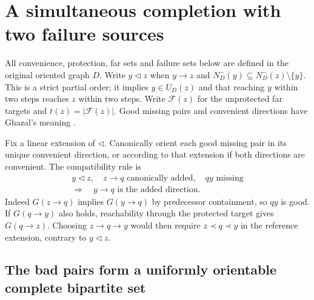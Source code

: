 \section{A simultaneous completion with two failure sources}
\label{sec:uniform-two-positive-completion}

All convenience, protection, far sets and failure sets below are defined
in the original oriented graph $D$.
Write $y\triangleleft z$ when
$y\to z$ and $N_D^-(y)\subseteq N_D^-(z)\setminus\{y\}$.
This is a strict partial order; it implies $y\in U_D(z)$ and that
reaching $y$ within two steps reaches $z$ within two steps.
Write $\mathcal F(z)$ for the unprotected far targets and
$t(z)=|\mathcal F(z)|$.
Good missing pairs and convenient directions have Ghazal's meaning
\cite{Ghazal2012}.

Fix a linear extension of $\triangleleft$.
Canonically orient each good missing pair in its unique convenient
direction, or according to that extension if both directions are
convenient.
The compatibility rule is
\[
 \begin{gathered}
 y\triangleleft z,\quad z\to q\text{ canonically added},\quad qy\text{ missing}\\
 \Longrightarrow\quad y\to q\text{ is the added direction}.
 \end{gathered}
 \tag{UT1}\label{eq:uniform-protection-compatibility}
\]
Indeed $G(z\to q)$ implies $G(y\to q)$ by predecessor containment,
so $qy$ is good.  If $G(q\to y)$ also holds, reachability through
the protected target gives $G(q\to z)$.
Choosing $z\to q\to y$ would then require $z\prec q\prec y$ in
the reference extension, contrary to $y\triangleleft z$.

\subsection{The bad pairs form a uniformly orientable complete bipartite set}

